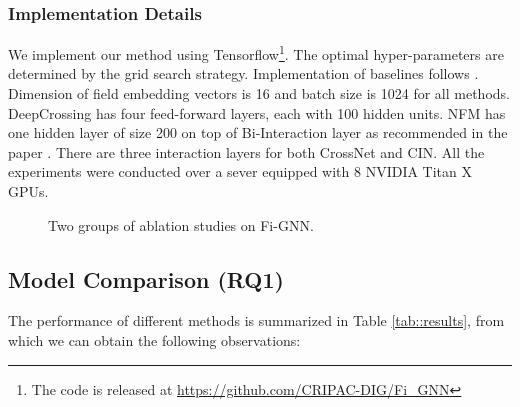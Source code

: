 \documentclass[sigconf]{acmart}
\begin{document}
\subsubsection{Implementation Details}
We implement our method using Tensorflow\footnote{The code is released at \url{https://github.com/CRIPAC-DIG/Fi_GNN}}. The optimal hyper-parameters are determined by the grid search strategy. 
Implementation of baselines follows \cite{song2018autoint}.
Dimension of field embedding vectors is 16 and batch size is 1024 for all methods. 
DeepCrossing has four feed-forward layers, each with 100 hidden units.  
NFM has one hidden layer of size 200 on top of Bi-Interaction layer as recommended in the paper \cite{he2017neural}. 
There are three interaction layers for both CrossNet and CIN. 
All the experiments were conducted over a sever equipped with 8 NVIDIA Titan X GPUs.


\begin{figure*}[hbtp]
\caption{Two groups of ablation studies on Fi-GNN.}
\label{fig:performance}
\end{figure*}


\subsection{Model Comparison (RQ1)}\label{sect:result}
The performance of different methods is summarized in Table \ref{tab::results}, from which we can obtain the following observations:
 
\end{document}
